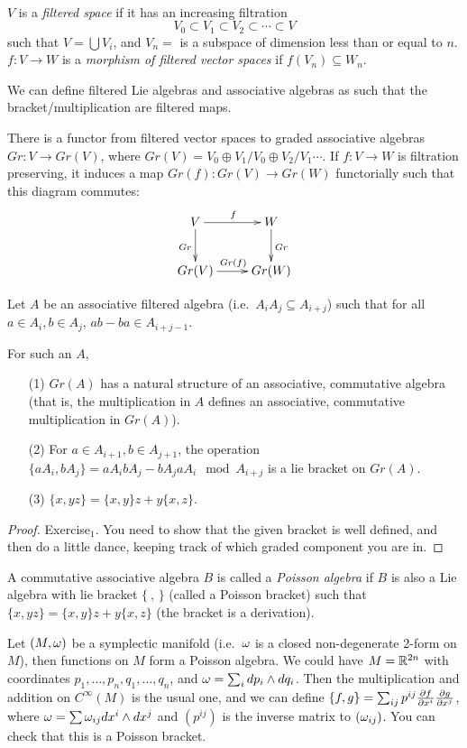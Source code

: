  \
 \begin{definition}
   $V$ is a \emph{filtered space} if it has an increasing
   filtration
   \[
    V_0\subset V_1\subset V_2 \subset \cdots \subset V
   \]
   such that $V=\bigcup V_i$, and $V_n=$ is a subspace of dimension less than or equal
   to $n$. $f:V\to W$ is a \emph{morphism of filtered vector spaces} if
   $f(V_n)\subseteq W_n$.
 \end{definition}
 We can define filtered Lie algebras and associative algebras as such that the
 bracket/multiplication are filtered maps.

 There is a functor from filtered vector spaces to graded associative algebras $Gr:V\to Gr(V)$, where $Gr(V)= V_0\oplus V_1/V_0\oplus V_2/V_1\cdots$. If $f:V\to W$ is filtration preserving, it induces a map $Gr(f):Gr(V)\to Gr(W)$ functorially such that this diagram commutes:
 \[\xymatrix{
 V\ar[r]^f \ar[d]_{Gr} & W\ar[d]^{Gr}\\
 Gr(V)\ar[r]^{Gr(f)} & Gr(W)
 }\]

 Let $A$ be an associative filtered algebra (i.e.\ $A_iA_j\subseteq A_{i+j}$) such
that for all $a\in A_i, b\in A_j$,  $ab-ba \in A_{i+j-1}$.
\begin{proposition} For such an $A$,
  \begin{itemize}
  \item[(1)] $Gr(A)$ has a natural structure of an associative, commutative algebra
  (that is, the multiplication in $A$ defines an associative, commutative
  multiplication in $Gr(A)$).
  \item[(2)] For $a\in A_{i+1}, b\in A_{j+1}$, the operation $\{aA_i,bA_j\}=
  aA_ibA_j-bA_jaA_i \mod A_{i+j}$ is a lie bracket on $Gr(A)$.
  \item[(3)] $\{x,yz\} = \{x,y\}z+y\{x,z\}$.
  \end{itemize}
\end{proposition}
  \begin{proof}
    Exercise$_1$. You need to show that the given bracket is well defined, and then do a little dance, keeping track of which graded component you are in.
  \end{proof}

  \begin{definition}
    A commutative associative algebra $B$ is called a \emph{Poisson algebra} if $B$ is also a Lie algebra with lie bracket $\{\ ,\,\}$ (called a Poisson bracket) such that $\{x,yz\} = \{x,y\}z+y\{x,z\}$ (the bracket is a derivation).
  \end{definition}
  \begin{example}
    Let $(M,\omega)$ be a symplectic manifold (i.e.\ $\omega$ is a closed non-degenerate
    2-form on $M$), then functions on $M$ form a Poisson algebra. We could have
    $M=\mathbb{R}^{2n}$ with coordinates $p_1,\dots, p_n,q_1,\dots, q_n$, and $\omega = \sum_i
    dp_i\wedge dq_i$. Then the multiplication and addition on $C^\infty(M)$ is the
    usual one, and we can define $\{f,g\} = \sum_{ij} p^{ij}
    \frac{\partial f}{\partial x^i}\frac{\partial g}{\partial x^j}$, where $\omega = \sum \omega_{ij}dx^i\wedge dx^j$ and
    $(p^{ij})$ is the inverse matrix to $(\omega_{ij})$. You can check that this is a
    Poisson bracket.
  \end{example}

